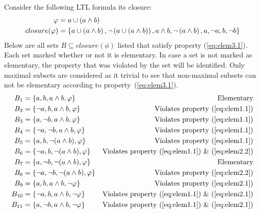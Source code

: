 \begin{example}
Consider the following LTL formula its closure:
\begin{align*}
    \varphi &= a \cup \left( a \land b \right) \\
    closure(\varphi) &= \left\{ a \cup \left( a \land b \right), \lnot \left( a \cup \left( a \land b \right) \right), a \land b, \lnot \left( a \land b \right), a, \lnot a, b, \lnot b \right\}
\end{align*}
Below are all sets $B \subseteq closure(\phi)$ listed that satisfy property (\ref{eq:elem3.1}). Each set marked whether or not it is elementary. In case a set is not marked as elementary, the property that was violated by the set will be identified. Only maximal subsets are considered as it trivial to see that non-maximal subsets can not be elementary according to property~(\ref{eq:elem3.1}).
\begin{align*}
    B_1    &= \left\{ a,       b,       a\land b,         \phi       \right\} &\text{Elementary} \\
    B_2    &= \left\{ \lnot a, b,       a\land b,         \phi       \right\} &\text{Violates property (\ref{eq:elem1.1})} \\
    B_3    &= \left\{ a,       \lnot b, a\land b,         \phi       \right\} &\text{Violates property (\ref{eq:elem1.1})} \\
    B_4    &= \left\{ \lnot a, \lnot b, a\land b,         \phi       \right\} &\text{Violates property (\ref{eq:elem1.1})} \\
    B_5    &= \left\{ a,       b,       \lnot (a\land b), \phi       \right\} &\text{Violates property (\ref{eq:elem1.1})} \\
    B_6    &= \left\{ \lnot a, b,       \lnot (a\land b), \phi       \right\} &\text{Violates property (\ref{eq:elem1.1}) \& (\ref{eq:elem2.2})} \\
    B_7    &= \left\{ a,       \lnot b, \lnot (a\land b), \phi       \right\} &\text{Elementary} \\
    B_8    &= \left\{ \lnot a, \lnot b, \lnot (a\land b), \phi       \right\} &\text{Violates property (\ref{eq:elem2.2})} \\
    B_9    &= \left\{ a,       b,       a\land b,         \lnot \phi \right\} &\text{Violates property (\ref{eq:elem2.1})} \\
    B_{10} &= \left\{ \lnot a, b,       a\land b,         \lnot \phi \right\} &\text{Violates property (\ref{eq:elem1.1}) \& (\ref{eq:elem2.1})} \\
    B_{11} &= \left\{ a,       \lnot b, a\land b,         \lnot \phi \right\} &\text{Violates property (\ref{eq:elem1.1}) \& (\ref{eq:elem2.1})} \\

\end{align*}
\end{example}
